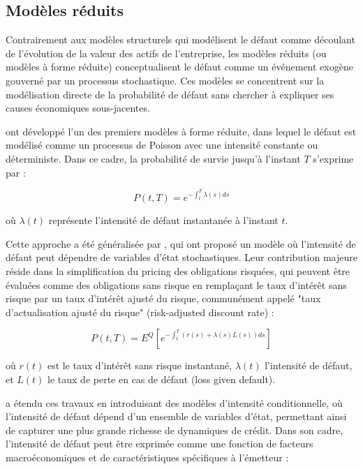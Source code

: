 \subsection{Modèles réduits}

Contrairement aux modèles structurels qui modélisent le défaut comme découlant de l'évolution de la valeur des actifs de l'entreprise, les modèles réduits (ou modèles à forme réduite) conceptualisent le défaut comme un événement exogène gouverné par un processus stochastique. Ces modèles se concentrent sur la modélisation directe de la probabilité de défaut sans chercher à expliquer ses causes économiques sous-jacentes.

\citet{jarrow1995} ont développé l'un des premiers modèles à forme réduite, dans lequel le défaut est modélisé comme un processus de Poisson avec une intensité constante ou déterministe. Dans ce cadre, la probabilité de survie jusqu'à l'instant $T$ s'exprime par :

\begin{equation}
P(t,T) = e^{-\int_t^T \lambda(s)ds}
\end{equation}

où $\lambda(t)$ représente l'intensité de défaut instantanée à l'instant $t$.

Cette approche a été généralisée par \citet{duffie1999}, qui ont proposé un modèle où l'intensité de défaut peut dépendre de variables d'état stochastiques. Leur contribution majeure réside dans la simplification du pricing des obligations risquées, qui peuvent être évaluées comme des obligations sans risque en remplaçant le taux d'intérêt sans risque par un taux d'intérêt ajusté du risque, communément appelé "taux d'actualisation ajusté du risque" (risk-adjusted discount rate) :

\begin{equation}
P(t,T) = E^Q\left[e^{-\int_t^T (r(s) + \lambda(s)L(s))ds}\right]
\end{equation}

où $r(t)$ est le taux d'intérêt sans risque instantané, $\lambda(t)$ l'intensité de défaut, et $L(t)$ le taux de perte en cas de défaut (loss given default).

\citet{lando1998} a étendu ces travaux en introduisant des modèles d'intensité conditionnelle, où l'intensité de défaut dépend d'un ensemble de variables d'état, permettant ainsi de capturer une plus grande richesse de dynamiques de crédit. Dans son cadre, l'intensité de défaut peut être exprimée comme une fonction de facteurs macroéconomiques et de caractéristiques spécifiques à l'émetteur :

